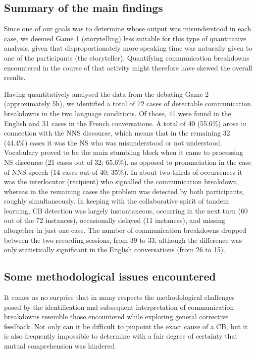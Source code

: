 \documentclass[output=paper,colorlinks,citecolor=brown,modfonts,nonflat]{../langscibook}
\begin{document}
\subsection{Summary of the main findings}\label{sec:scheuer:5.3}

Since one of our goals was to determine whose output was misunderstood in each case, we deemed Game 1 (storytelling) less suitable for this type of quantitative analysis, given that disproportionately more speaking time was naturally given to one of the participants (the storyteller). Quantifying communication breakdowns encountered in the course of that activity might therefore have skewed the overall results. 

Having quantitatively analysed the data from the debating Game 2 (approximately 5h), we identified a total of 72 cases of detectable communication breakdowns in the two language conditions. Of those, 41 were found in the English and 31 cases in the French conversations. A total of 40 (55.6\%) arose in connection with the NNS discourse, which means that in the remaining 32 (44.4\%) cases it was the NS who was misunderstood or not understood. Vocabulary proved to be the main stumbling block when it came to processing NS discourse (21 cases out of 32; 65.6\%), as opposed to pronunciation in the case of NNS speech (14 cases out of 40; 35\%). In about two-thirds of occurrences it was the interlocutor (recipient) who signalled the communication breakdown, whereas in the remaining cases the problem was detected by both participants, roughly simultaneously. In keeping with the collaborative spirit of tandem learning, CB detection was largely instantaneous, occurring in the next turn (60 out of the 72 instances), occasionally delayed (11 instances), and missing altogether in just one case. The number of communication breakdowns dropped between the two recording sessions, from 39 to 33, although the difference was only statistically significant in the English conversations (from 26 to 15).

\subsection{Some methodological issues encountered}\label{sec:scheuer:5.4}

It comes as no surprise that in many respects the methodological challenges posed by the identification and subsequent interpretation of communication breakdowns resemble those encountered while exploring general corrective feedback. Not only can it be difficult to pinpoint the exact cause of a CB, but it is also frequently impossible to determine with a fair degree of certainty that mutual comprehension was hindered. 
\end{document}

